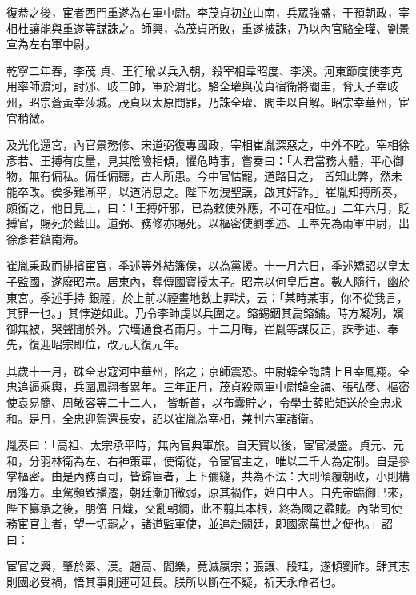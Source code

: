 \begin{pinyinscope}
 復恭之後，宦者西門重遂為右軍中尉。李茂貞初並山南，兵眾強盛，干預朝政，宰相杜讓能與重遂等謀誅之。師興，為茂貞所敗，重遂被誅，乃以內官駱全瓘、劉景宣為左右軍中尉。



 乾寧二年春，李茂
 貞、王行瑜以兵入朝，殺宰相韋昭度、李溪。河東節度使李克用率師渡河，討邠、岐二帥，軍於渭北。駱全瓘與茂貞宿衛將閻圭，脅天子幸岐州，昭宗蒼黃幸莎城。茂貞以太原問罪，乃誅全瓘、閻圭以自解。昭宗幸華州，宦官稍微。



 及光化還宮，內官景務修、宋道弼復專國政，宰相崔胤深惡之，中外不睦。宰相徐彥若、王搏有度量，見其陰險相傾，懼危時事，嘗奏曰：「人君當務大體，平心御物，無有偏私。偏任偏聽，古人所患。今中官怙寵，道路目之，
 皆知此弊，然未能卒改。俟多難漸平，以道消息之。陛下勿洩聖謨，啟其奸詐。」崔胤知搏所奏，頗銜之，他日見上，曰：「王搏奸邪，已為敕使外應，不可在相位。」二年六月，貶搏官，賜死於藍田。道弼、務修亦賜死。以樞密使劉季述、王奉先為兩軍中尉，出徐彥若鎮南海。



 崔胤秉政而排擯宦官，季述等外結籓侯，以為黨援。十一月六日，季述矯詔以皇太子監國，遂廢昭宗。居東內，奪傳國寶授太子。昭宗以何皇后宮。數人隨行，幽於東宮。季述手持
 銀禋，於上前以禋畫地數上罪狀，云：「某時某事，你不從我言，其罪一也。」其悖逆如此。乃令李師虔以兵圍之。鎔錫錮其扃鎔鐍。時方凝冽，嬪御無被，哭聲聞於外。穴墻通食者兩月。十二月晦，崔胤等謀反正，誅季述、奉先，復迎昭宗即位，改元天復元年。



 其歲十一月，硃全忠寇河中華州，陷之；京師震恐。中尉韓全誨請上且幸鳳翔。全忠追逼乘輿，兵圍鳳翔者累年。三年正月，茂貞殺兩軍中尉韓全誨、張弘彥、樞密使袁易簡、周敬容等二十二人，
 皆斬首，以布囊貯之，令學士薛貽矩送於全忠求和。是月，全忠迎駕還長安，詔以崔胤為宰相，兼判六軍諸衛。



 胤奏曰：「高祖、太宗承平時，無內官典軍旅。自天寶以後，宦官浸盛。貞元、元和，分羽林衛為左、右神策軍，使衛從，令宦官主之，唯以二千人為定制。自是參掌樞密。由是內務百司，皆歸宦者，上下彌縫，共為不法：大則傾覆朝政，小則構扇籓方。車駕頻致播遷，朝廷漸加微弱，原其禍作，始自中人。自先帝臨御已來，陛下纂承之後，朋儕
 日熾，交亂朝綱，此不翦其本根，終為國之蟊賊。內諸司使務宦官主者，望一切罷之，諸道監軍使，並追赴闕廷，即國家萬世之便也。」詔曰：



 宦官之興，肇於秦、漢。趙高、閻樂，竟滅嬴宗；張讓、段珪，遂傾劉祚。肆其志則國必受禍，悟其事則運可延長。朕所以斷在不疑，祈天永命者也。




\end{pinyinscope}
